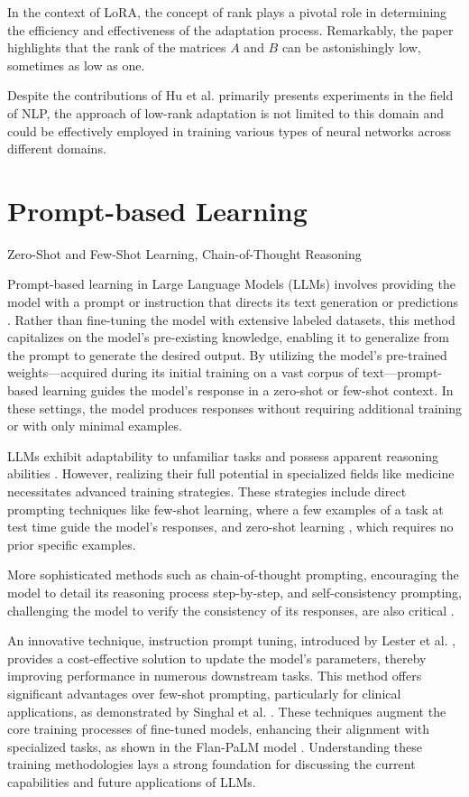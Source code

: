 In the context of LoRA, the concept of rank plays a pivotal role in determining the efficiency and effectiveness of the adaptation process. Remarkably, the paper highlights that the rank of the matrices \( A \) and \( B \) can be astonishingly low, sometimes as low as one.

Despite the contributions of Hu et al. \cite{hu2021lora} primarily presents experiments in the field of NLP, the approach of low-rank adaptation is not limited to this domain and could be effectively employed in training various types of neural networks across different domains.

\section{Prompt-based Learning}
Zero-Shot and Few-Shot Learning, Chain-of-Thought Reasoning

Prompt-based learning in Large Language Models (LLMs) involves providing the model with a prompt or instruction that directs its text generation or predictions \cite{71}. Rather than fine-tuning the model with extensive labeled datasets, this method capitalizes on the model’s pre-existing knowledge, enabling it to generalize from the prompt to generate the desired output. By utilizing the model’s pre-trained weights—acquired during its initial training on a vast corpus of text—prompt-based learning guides the model’s response in a zero-shot or few-shot context. In these settings, the model produces responses without requiring additional training or with only minimal examples.

LLMs exhibit adaptability to unfamiliar tasks and possess apparent reasoning abilities \cite{radford2019language, brown2020language}. However, realizing their full potential in specialized fields like medicine necessitates advanced training strategies. These strategies include direct prompting techniques like few-shot learning, where a few examples of a task at test time guide the model's responses, and zero-shot learning \cite{brown2020language, radford2019language}, which requires no prior specific examples.

More sophisticated methods such as chain-of-thought prompting, encouraging the model to detail its reasoning process step-by-step, and self-consistency prompting, challenging the model to verify the consistency of its responses, are also critical \cite{wei2022chain}.

An innovative technique, instruction prompt tuning, introduced by Lester et al. \cite{lester2021power}, provides a cost-effective solution to update the model's parameters, thereby improving performance in numerous downstream tasks. This method offers significant advantages over few-shot prompting, particularly for clinical applications, as demonstrated by Singhal et al. \cite{singhal2022large}. These techniques augment the core training processes of fine-tuned models, enhancing their alignment with specialized tasks, as shown in the Flan-PaLM model \cite{wei2022finetuned}. Understanding these training methodologies lays a strong foundation for discussing the current capabilities and future applications of LLMs.

